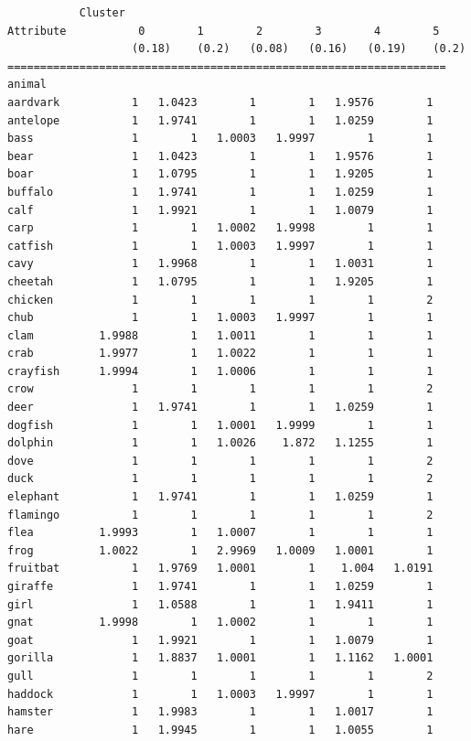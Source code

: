 \documentclass[11pt,a4paper]{article}
\begin{document}
\begin{verbatim}
           Cluster
Attribute           0        1        2        3        4        5
                   (0.18)    (0.2)   (0.08)   (0.16)   (0.19)    (0.2)
===================================================================
animal
aardvark           1   1.0423        1        1   1.9576        1
antelope           1   1.9741        1        1   1.0259        1
bass               1        1   1.0003   1.9997        1        1
bear               1   1.0423        1        1   1.9576        1
boar               1   1.0795        1        1   1.9205        1
buffalo            1   1.9741        1        1   1.0259        1
calf               1   1.9921        1        1   1.0079        1
carp               1        1   1.0002   1.9998        1        1
catfish            1        1   1.0003   1.9997        1        1
cavy               1   1.9968        1        1   1.0031        1
cheetah            1   1.0795        1        1   1.9205        1
chicken            1        1        1        1        1        2
chub               1        1   1.0003   1.9997        1        1
clam          1.9988        1   1.0011        1        1        1
crab          1.9977        1   1.0022        1        1        1
crayfish      1.9994        1   1.0006        1        1        1
crow               1        1        1        1        1        2
deer               1   1.9741        1        1   1.0259        1
dogfish            1        1   1.0001   1.9999        1        1
dolphin            1        1   1.0026    1.872   1.1255        1
dove               1        1        1        1        1        2
duck               1        1        1        1        1        2
elephant           1   1.9741        1        1   1.0259        1
flamingo           1        1        1        1        1        2
flea          1.9993        1   1.0007        1        1        1
frog          1.0022        1   2.9969   1.0009   1.0001        1
fruitbat           1   1.9769   1.0001        1    1.004   1.0191
giraffe            1   1.9741        1        1   1.0259        1
girl               1   1.0588        1        1   1.9411        1
gnat          1.9998        1   1.0002        1        1        1
goat               1   1.9921        1        1   1.0079        1
gorilla            1   1.8837   1.0001        1   1.1162   1.0001
gull               1        1        1        1        1        2
haddock            1        1   1.0003   1.9997        1        1
hamster            1   1.9983        1        1   1.0017        1
hare               1   1.9945        1        1   1.0055        1

\end{verbatim}
\end{document}
